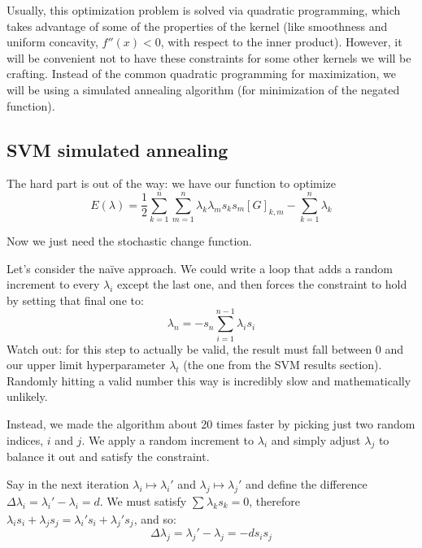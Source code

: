 Usually, this optimization problem is solved via quadratic programming, which takes advantage of some of the properties of the kernel (like smoothness and uniform concavity, $f''(x)<0$, with respect to the inner product). However, it will be convenient not to have these constraints for some other kernels we will be crafting. Instead of the common quadratic programming for maximization, we will be using a simulated annealing algorithm (for minimization of the negated function).

\subsection*{SVM simulated annealing}
\label{sec:svm_annealing}

The hard part is out of the way: we have our function to optimize
\begin{equation*}
    E(\lambda) = \frac{1}{2}\sum_{k=1}^{n}\sum_{m=1}^{n} \lambda _k \lambda _m s_ks_m[G]_{k,m} - \sum_{k=1}^{n} \lambda _k 
\end{equation*}


Now we just need the stochastic change function.

Let's consider the naïve approach. We could write a loop that adds a random increment to every $\lambda_i$ except the last one, and then forces the constraint to hold by setting that final one to:
$$
\lambda_n = -s_n \sum_{i=1}^{n-1} \lambda_i s_i
$$
Watch out: for this step to actually be valid, the result must fall between $0$ and our upper limit hyperparameter $\lambda_t$ (the one from the SVM results section). Randomly hitting a valid number this way is incredibly slow and mathematically unlikely.

Instead, we made the algorithm about 20\futnotetext{} times faster by picking just two random indices, $i$ and $j$. We apply a random increment to $\lambda_i$ and simply adjust $\lambda_j$ to balance it out and satisfy the constraint. 

Say in the next iteration \(\lambda _i\mapsto \lambda _i'\) and \(\lambda _j\mapsto \lambda _j'\) and define the difference \(\Delta \lambda_i=\lambda _i'- \lambda _i=d\). We must satisfy \(\sum_{}^{} \lambda _ks_k=0\), therefore \(\lambda _is_i+\lambda _js_j=\lambda _i's_i+\lambda _j's_j\), and so:
\begin{equation*}
    \Delta \lambda_j = \lambda _j'-\lambda _j=-ds_is_j
\end{equation*}


